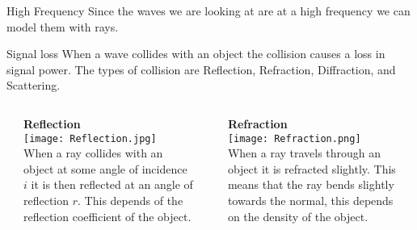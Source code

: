 \documentclass[final]{beamer}
\theoremstyle{plain}
\theoremstyle{definition}
\theoremstyle{remark}
\newlength{\twocolwid}
\begin{document}
\begin{frame}[t]
\begin{columns}[t]
\begin{column}{\twocolwid}
\begin{columns}
\begin{column}{0.45\linewidth}
\end{column}
\end{columns}

\begin{alertblock}{High Frequency}
Since the waves we are looking at are at a high frequency we can model them with rays.
\end{alertblock}

\begin{block}{Signal loss}
\vspace{-1.5cm}
When a wave collides with an object the collision causes a loss in signal power. The types of collision are Reflection, Refraction, Diffraction, and Scattering.
\vspace{0.5cm}
\begin{columns}
\begin{column}{0.03\linewidth}
\end{column}
\begin{column}{0.46\linewidth}
\textbf{Reflection} \\
\texttt{[image: Reflection.jpg]} 
\cite{Reflection} \\
When a ray collides with an object at some angle of incidence $i$ it is then reflected at an angle of reflection $r$. This depends of the reflection coefficient of the object.
\end{column}
\begin{column}{0.02\linewidth}
\end{column}
\begin{column}{0.46\linewidth}
\textbf{Refraction} \\
\texttt{[image: Refraction.png]} 
\cite{Refraction} 
\\ 
When a ray travels through an object it is refracted slightly. This means that the ray bends slightly towards the normal, this depends on the density of the object.
\end{column}
\begin{column}{0.03\linewidth}
\end{column}
\end{columns}
\end{block}


\end{column}
\end{columns}
\end{frame}
\end{document}
